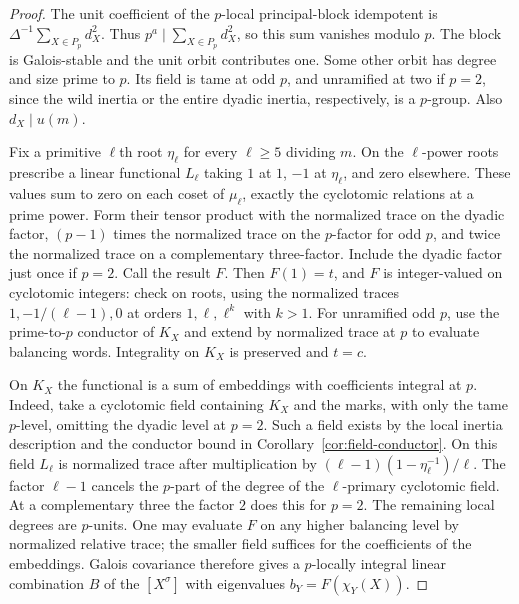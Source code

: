 \documentclass[11pt,a4paper]{article}
\numberwithin{equation}{section}
\theoremstyle{remark}
\begin{document}
\begin{proof}
The unit coefficient of the $p$-local principal-block idempotent is $\Delta^{-1}\sum_{X\in P_p}d_X^2$. Thus $p^a\mid\sum_{X\in P_p}d_X^2$, so this sum vanishes modulo $p$. The block is Galois-stable and the unit orbit contributes one. Some other orbit has degree and size prime to $p$. Its field is tame at odd $p$, and unramified at two if $p=2$, since the wild inertia or the entire dyadic inertia, respectively, is a $p$-group. Also $d_X\mid u(m)$.

Fix a primitive $\ell$th root $\eta_\ell$ for every $\ell\ge5$ dividing $m$. On the $\ell$-power roots prescribe a linear functional $L_\ell$ taking $1$ at $1$, $-1$ at $\eta_\ell$, and zero elsewhere. These values sum to zero on each coset of $\mu_\ell$, exactly the cyclotomic relations at a prime power. Form their tensor product with the normalized trace on the dyadic factor, $(p-1)$ times the normalized trace on the $p$-factor for odd $p$, and twice the normalized trace on a complementary three-factor. Include the dyadic factor just once if $p=2$. Call the result $F$. Then $F(1)=t$, and $F$ is integer-valued on cyclotomic integers: check on roots, using the normalized traces $1,-1/(\ell-1),0$ at orders $1,\ell,\ell^k$ with $k>1$. For unramified odd $p$, use the prime-to-$p$ conductor of $K_X$ and extend by normalized trace at $p$ to evaluate balancing words. Integrality on $K_X$ is preserved and $t=c$.

On $K_X$ the functional is a sum of embeddings with coefficients integral at $p$. Indeed, take a cyclotomic field containing $K_X$ and the marks, with only the tame $p$-level, omitting the dyadic level at $p=2$. Such a field exists by the local inertia description and the conductor bound in Corollary~\ref{cor:field-conductor}. On this field $L_\ell$ is normalized trace after multiplication by $(\ell-1)(1-\eta_\ell^{-1})/\ell$. The factor $\ell-1$ cancels the $p$-part of the degree of the $\ell$-primary cyclotomic field. At a complementary three the factor $2$ does this for $p=2$. The remaining local degrees are $p$-units. One may evaluate $F$ on any higher balancing level by normalized relative trace; the smaller field suffices for the coefficients of the embeddings. Galois covariance therefore gives a $p$-locally integral linear combination $B$ of the $[X^\sigma]$ with eigenvalues $b_Y=F(\chi_Y(X))$.


\end{proof}
\end{document}
